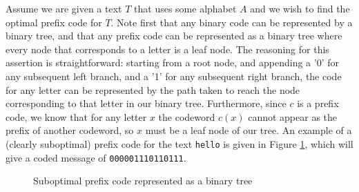 \documentclass[paper=a4, fontsize=10pt]{article} %
\numberwithin{equation}{section} %
\numberwithin{figure}{section} %
\numberwithin{table}{section} %
\begin{document}
Assume we are given a text $T$ that uses some alphabet $A$ and we wish to find the optimal prefix code for $T$. Note first that any binary code can be represented by a binary tree, and that any prefix code can be represented as a binary tree where every node that corresponds to a letter is a leaf node. The reasoning for this assertion is straightforward: starting from a root node, and appending a '0' for any subsequent left branch, and a '1' for any subsequent right branch, the code for any letter can be represented by the path taken to reach the node corresponding to that letter in our binary tree. Furthermore, since $c$ is a prefix code, we know that for any letter $x$ the codeword $c(x)$ cannot appear as the prefix of another codeword, so $x$ must be a leaf node of our tree. An example of a (clearly suboptimal) prefix code for the text \texttt{hello} is given in Figure \ref{fig:subopt}, which will give a coded message of \texttt{000001110110111}.

\begin{figure}[h]
\centering


\caption{Suboptimal prefix code represented as a binary tree} \label{fig:subopt}
\end{figure}
\end{document}
